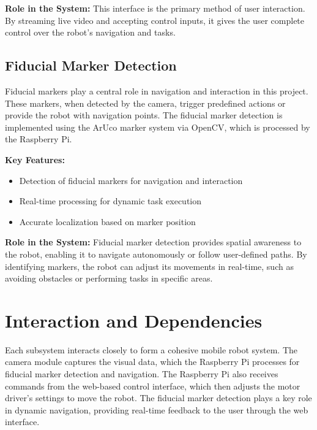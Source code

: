 \textbf{Role in the System:}
This interface is the primary method of user interaction. By streaming live video and accepting control inputs, it gives the user complete control over the robot's navigation and tasks.

\subsection{\label{subsec:marker_detection} Fiducial Marker Detection}
Fiducial markers play a central role in navigation and interaction in this project. These markers, when detected by the camera, trigger predefined actions or provide the robot with navigation points. The fiducial marker detection is implemented using the ArUco marker system via OpenCV, which is processed by the Raspberry Pi.

\textbf{Key Features:}
\begin{itemize}
	\item Detection of fiducial markers for navigation and interaction
	\item Real-time processing for dynamic task execution
	\item Accurate localization based on marker position
\end{itemize}

\textbf{Role in the System:}
Fiducial marker detection provides spatial awareness to the robot, enabling it to navigate autonomously or follow user-defined paths. By identifying markers, the robot can adjust its movements in real-time, such as avoiding obstacles or performing tasks in specific areas.

\section{\label{sec:interaction} Interaction and Dependencies}
Each subsystem interacts closely to form a cohesive mobile robot system. The camera module captures the visual data, which the Raspberry Pi processes for fiducial marker detection and navigation. The Raspberry Pi also receives commands from the web-based control interface, which then adjusts the motor driver’s settings to move the robot. The fiducial marker detection plays a key role in dynamic navigation, providing real-time feedback to the user through the web interface.

